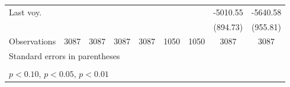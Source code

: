 \begin{table}[htbp]
\begin{tabular}{@{\hskip\tabcolsep\extracolsep\fill}l*{8}{c}}
Last voy.           &                     &                     &                     &                     &                     &                     &    -5010.55\sym{***}&    -5640.58\sym{***}\\
                    &                     &                     &                     &                     &                     &                     &    (894.73)         &    (955.81)         \\
\hline
Observations        &        3087         &        3087         &        3087         &        3087         &        1050         &        1050         &        3087         &        3087         \\
\hline\hline
\multicolumn{9}{l}{\footnotesize Standard errors in parentheses}\\
\multicolumn{9}{l}{\footnotesize  }\\
\multicolumn{9}{l}{\footnotesize \sym{*} \(p<0.10\), \sym{**} \(p<0.05\), \sym{***} \(p<0.01\)}\\
\end{tabular}
\end{table}

